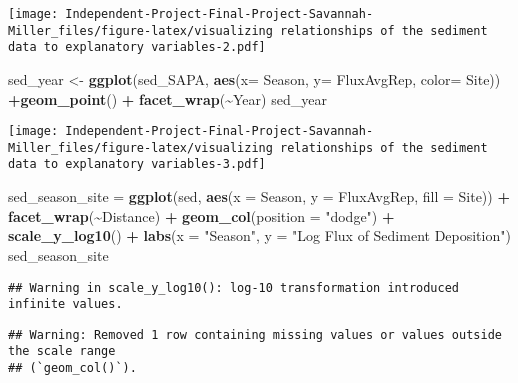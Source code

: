 \documentclass[
]{article}
\newenvironment{Shaded}{\begin{snugshade}}{\end{snugshade}}
\newcommand{\AttributeTok}[1]{\textcolor[rgb]{0.13,0.29,0.53}{#1}}
\newcommand{\FunctionTok}[1]{\textcolor[rgb]{0.13,0.29,0.53}{\textbf{#1}}}
\newcommand{\NormalTok}[1]{#1}
\newcommand{\OtherTok}[1]{\textcolor[rgb]{0.56,0.35,0.01}{#1}}
\newcommand{\SpecialCharTok}[1]{\textcolor[rgb]{0.81,0.36,0.00}{\textbf{#1}}}
\newcommand{\StringTok}[1]{\textcolor[rgb]{0.31,0.60,0.02}{#1}}
\begin{document}
\texttt{[image: Independent-Project-Final-Project-Savannah-Miller\_files/figure-latex/visualizing relationships of the sediment data to explanatory variables-2.pdf]}

\begin{Shaded}
\begin{Highlighting}[]
\NormalTok{sed\_year }\OtherTok{\textless{}{-}} \FunctionTok{ggplot}\NormalTok{(sed\_SAPA, }\FunctionTok{aes}\NormalTok{(}\AttributeTok{x=}\NormalTok{ Season, }\AttributeTok{y=}\NormalTok{ FluxAvgRep, }\AttributeTok{color=}\NormalTok{ Site)) }\SpecialCharTok{+}\FunctionTok{geom\_point}\NormalTok{() }\SpecialCharTok{+} \FunctionTok{facet\_wrap}\NormalTok{(}\SpecialCharTok{\textasciitilde{}}\NormalTok{Year)}
\NormalTok{sed\_year}
\end{Highlighting}
\end{Shaded}

\texttt{[image: Independent-Project-Final-Project-Savannah-Miller\_files/figure-latex/visualizing relationships of the sediment data to explanatory variables-3.pdf]}

\begin{Shaded}
\begin{Highlighting}[]
\NormalTok{sed\_season\_site }\OtherTok{=} \FunctionTok{ggplot}\NormalTok{(sed, }\FunctionTok{aes}\NormalTok{(}\AttributeTok{x =}\NormalTok{ Season, }\AttributeTok{y =}\NormalTok{ FluxAvgRep, }\AttributeTok{fill =}\NormalTok{ Site)) }\SpecialCharTok{+}
  \FunctionTok{facet\_wrap}\NormalTok{(}\SpecialCharTok{\textasciitilde{}}\NormalTok{Distance) }\SpecialCharTok{+}
  \FunctionTok{geom\_col}\NormalTok{(}\AttributeTok{position =} \StringTok{"dodge"}\NormalTok{) }\SpecialCharTok{+}
  \FunctionTok{scale\_y\_log10}\NormalTok{() }\SpecialCharTok{+}
  \FunctionTok{labs}\NormalTok{(}\AttributeTok{x =} \StringTok{"Season"}\NormalTok{, }\AttributeTok{y =} \StringTok{"Log Flux of Sediment Deposition"}\NormalTok{) }
\NormalTok{sed\_season\_site}
\end{Highlighting}
\end{Shaded}

\begin{verbatim}
## Warning in scale_y_log10(): log-10 transformation introduced infinite values.
\end{verbatim}

\begin{verbatim}
## Warning: Removed 1 row containing missing values or values outside the scale range
## (`geom_col()`).
\end{verbatim}
\end{document}
